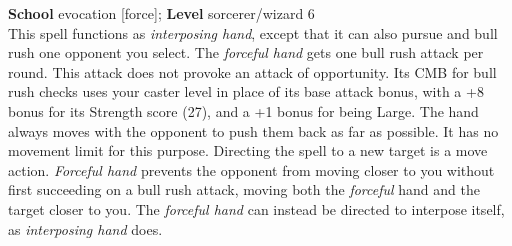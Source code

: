 \textbf{School} evocation [force]; \textbf{Level} sorcerer/wizard 6\\
This spell functions as \textit{interposing hand}, except that it can also pursue and bull rush one opponent you select. The \textit{forceful hand} gets one bull rush attack per round. This attack does not provoke an attack of opportunity. Its CMB for bull rush checks uses your caster level in place of its base attack bonus, with a +8 bonus for its Strength score (27), and a +1 bonus for being Large. The hand always moves with the opponent to push them back as far as possible. It has no movement limit for this purpose. Directing the spell to a new target is a move action. \textit{Forceful hand }prevents the opponent from moving closer to you without first succeeding on a bull rush attack, moving both the \textit{forceful }hand and the target closer to you. The \textit{forceful hand} can instead be directed to interpose itself, as \textit{interposing hand} does.\\
